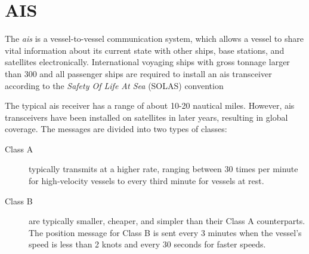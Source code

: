 \chapter{AIS}\label{chap:ais}

The \textit{\acrfull{ais}} is a vessel-to-vessel communication system, which allows a vessel to share vital information about its current state with other ships, base stations, and satellites electronically. International voyaging ships with gross tonnage larger than 300 and all passenger ships are required to install an \acrshort{ais} transceiver according to the \textit{Safety Of Life At Sea} (SOLAS) convention \cite{ais_wiki} 

The typical \acrshort{ais} receiver has a range of about 10-20 nautical miles. However, \acrshort{ais} transceivers have been installed on satellites in later years, resulting in global coverage. The messages are divided into two types of classes:
\begin{description}
    \item[Class A] typically transmits at a higher rate, ranging between 30 times per minute for high-velocity vessels to every third minute for vessels at rest. 
    \item[Class B] are typically smaller, cheaper, and simpler than their Class A counterparts. The position message for Class B is sent every 3 minutes when the vessel's speed is less than 2 knots and every 30 seconds for faster speeds. 
\end{description}

